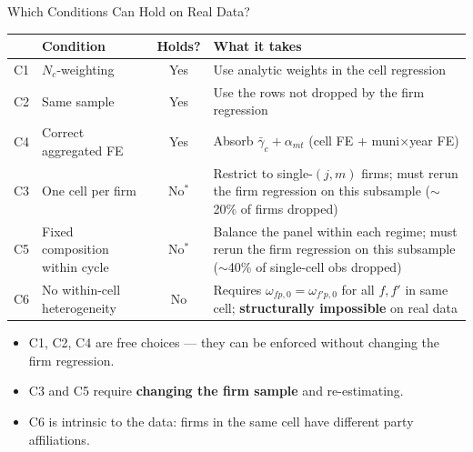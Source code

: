 \documentclass[aspectratio=169,11pt]{beamer}
\begin{document}
\begin{frame}{Which Conditions Can Hold on Real Data?}

\scriptsize
\renewcommand{\arraystretch}{1.3}
\begin{center}
\begin{tabular}{c p{3.8cm} c p{5.8cm}}
\toprule
 & \textbf{Condition} & \textbf{Holds?} & \textbf{What it takes} \\
\midrule
C1 & $N_c$-weighting & Yes & Use analytic weights in the cell regression \\
C2 & Same sample & Yes & Use the rows not dropped by the firm regression \\
C4 & Correct aggregated FE & Yes & Absorb $\bar\gamma_c + \alpha_{mt}$ (cell FE + muni$\times$year FE) \\
\midrule
C3 & One cell per firm & \textcolor{alertred}{No$^*$} & Restrict to single-$(j,m)$ firms; must rerun the firm regression on this subsample ($\sim$20\% of firms dropped) \\
C5 & Fixed composition within cycle & \textcolor{alertred}{No$^*$} & Balance the panel within each regime; must rerun the firm regression on this subsample ($\sim$40\% of single-cell obs dropped) \\
\midrule
C6 & No within-cell heterogeneity & \textcolor{alertred}{No} & Requires $\omega_{fp,0} = \omega_{f'p,0}$ for all $f, f'$ in same cell; \textbf{structurally impossible} on real data \\
\bottomrule
\end{tabular}
\end{center}

\small
\begin{itemize}\setlength{\itemsep}{3pt}
  \item C1, C2, C4 are free choices --- they can be enforced without changing the firm regression.
  \item C3 and C5 require \textbf{changing the firm sample} and re-estimating.
  \item C6 is intrinsic to the data: firms in the same cell have different party affiliations.
\end{itemize}

\end{frame}
\end{document}
